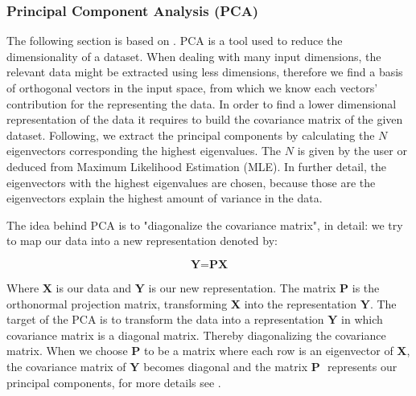 


\subsubsection{Principal Component Analysis (PCA)}
\label{sec:pca}
The following section is based on \cite{pcaTutorial}. \newline
PCA is a tool used to reduce the dimensionality of a dataset. When dealing with many input dimensions, the relevant data might be extracted using less dimensions, therefore we find a basis of orthogonal vectors in the input space, from which we know each vectors' contribution for the representing the data.  \newline
In order to find a lower dimensional representation of the data it requires to build the covariance matrix of the given dataset. Following, we extract the principal components by calculating the $N$ eigenvectors corresponding the highest eigenvalues. The $N$ is given by the user or deduced from Maximum Likelihood Estimation (MLE)\cite{minka2000automatic}. In further detail, the eigenvectors with the highest eigenvalues are chosen, because those are the eigenvectors explain the highest amount of variance in the data. \newline

The idea behind PCA is to "diagonalize the covariance matrix", in detail: we try to map our data into a new representation denoted by:

\begin{equation} \label{eq:pca_projection}
\textbf{Y} = \textbf{PX}
\end{equation}

Where $ \textbf{X} $ is our data and $ \textbf{Y} $ is our new representation. The matrix $\textbf{P}$ is the orthonormal projection matrix, transforming \textbf{X} into the representation $ \textbf{Y} $. The target of the PCA is to transform the data into a representation $ \textbf{Y} $ in which covariance matrix is a diagonal matrix. Thereby diagonalizing the covariance matrix. When we choose $ \textbf{P} $ to be a matrix where each row is an eigenvector of $ \textbf{X} $, the covariance matrix of $ \textbf{Y} $ becomes diagonal and the matrix $ \textbf{P }$ represents our principal components, for more details see \cite{pcaTutorial}.\newline

